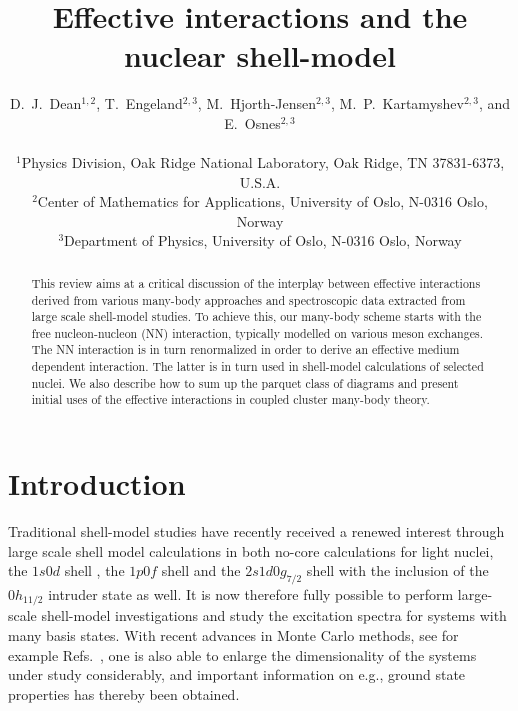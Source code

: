 \documentclass{article}
\begin{document}
\title{Effective interactions and the nuclear shell-model}
\author{D.~J.~Dean$^{1,2}$, T.~Engeland$^{2,3}$, M.~Hjorth-Jensen$^{2,3}$,
M.~P.~Kartamyshev$^{2,3}$, and E.~Osnes$^{2,3}$\\ \\
$^{1}$Physics Division, Oak Ridge National Laboratory, Oak Ridge, TN 37831-6373, U.S.A.\\
$^{2}$Center of Mathematics for Applications, University of Oslo, N-0316 Oslo, Norway\\
$^{3}$Department of Physics, University of Oslo, N-0316 Oslo, Norway}

\maketitle
\begin{abstract}
This review aims at a critical discussion of  the interplay between
effective interactions derived from various many-body approaches
and spectroscopic data extracted from large scale shell-model
studies. To achieve this,
our many-body scheme starts with
the free nucleon-nucleon (NN)
interaction, typically modelled
on various meson exchanges. The NN interaction
is in turn renormalized in order to derive an effective medium
dependent interaction. The latter is in turn used
in shell-model calculations of selected nuclei. We also describe
how to sum up the parquet class of diagrams and present
initial uses of the effective interactions in coupled cluster
many-body theory. 
\end{abstract}

\tableofcontents

\section{Introduction}\label{sec:sec1}


Traditional shell-model studies
have recently received a renewed
interest through large scale shell model calculations
in both no-core calculations \cite{bruce1,bruce2,bruce3,bruce4} for light nuclei, 
the $1s0d$ shell \cite{alex}, the $1p0f$ shell and the $2s1d0g_{7/2}$ shell with
the inclusion of the $0h_{11/2}$ intruder state as well.
It is now therefore fully possible to perform large-scale
shell-model investigations
and study the excitation spectra
for systems with
many basis states. With recent advances in
Monte Carlo methods, see for example 
Refs.~\cite{taka1,r:smmc_pr, vijay,ndrops97,bob1,bob2,bob3}, one is also
able to enlarge the dimensionality
of the systems under study considerably,
and important information on e.g., ground state properties
has thereby been obtained.
\end{document}
